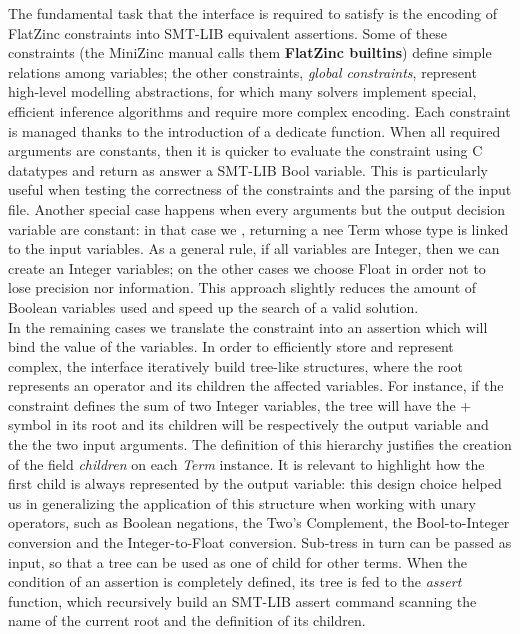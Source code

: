 The fundamental task that the interface is required to satisfy is the encoding of FlatZinc constraints into SMT-LIB equivalent assertions. Some of these constraints (the MiniZinc manual calls them \textbf{FlatZinc builtins}) define simple relations among variables; the other constraints, \textit{global constraints}, represent high-level modelling abstractions, for which many solvers implement special, efficient inference algorithms and require more complex encoding. Each constraint is managed thanks to the introduction of a dedicate function. When all required arguments are constants, then it is quicker to evaluate the constraint using C datatypes and return as answer a SMT-LIB Bool variable. This is particularly useful when testing the correctness of the constraints and the parsing of the input file. Another special case happens when every arguments but the output decision variable are constant: in that case we , returning a nee Term whose type is linked to the input variables. As a general rule, if all variables are Integer, then we can create an Integer variables; on the other cases we choose Float in order not to lose precision nor information. This approach slightly reduces the amount of Boolean variables used and speed up the search of a valid solution. \\
In the remaining cases we translate the constraint into an assertion which will bind the value of the variables. In order to efficiently store and represent complex, the interface iteratively build  tree-like structures, where the root represents an operator and its children the affected variables. For instance, if the constraint defines the sum of two Integer variables, the tree will have the + symbol in its root and its children will be respectively the output variable and the the two input arguments. The definition of this hierarchy justifies the creation of the field \textit{children} on each \textit{Term} instance. It is relevant to highlight how the first child is always represented by the output variable: this design choice helped us in generalizing the application of this structure when working with unary operators, such as Boolean negations, the Two's Complement, the Bool-to-Integer conversion and the Integer-to-Float conversion. Sub-tress in turn can be passed as input, so that a tree can be used as one of child for other terms. When the condition of an assertion is completely defined, its tree is fed to the \textit{assert} function, which recursively build an SMT-LIB assert command scanning the name of the current root and the definition of its children.

